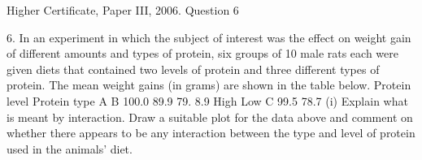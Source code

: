 \documentclass[a4paper,12pt]{article}
\begin{document}
Higher Certificate, Paper III, 2006. Question 6

\begin{framed}
6.
In an experiment in which the subject of interest was the effect on weight gain of
different amounts and types of protein, six groups of 10 male rats each were given
diets that contained two levels of protein and three different types of protein. The
mean weight gains (in grams) are shown in the table below.
Protein level
Protein type
A
B
100.0
89.9
79.
8.9
High
Low
C
99.5
78.7
(i) Explain what is meant by interaction. Draw a suitable plot for the data above
and comment on whether there appears to be any interaction between the type
and level of protein used in the animals' diet.

\end{framed}
\end{document}
